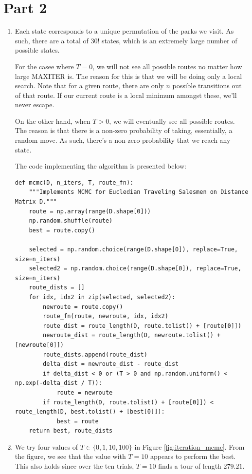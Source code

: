 \documentclass[12pt]{article}
\begin{document}
\newpage
\section*{Part 2}

\begin{enumerate}[label=(\alph*)]
  \item Each state corresponds to a unique permutation of the parks we visit. As such, there are a total of $30!$ states, which is an extremely large number of possible states.

  For the casee where $T = 0$, we will not see all possible routes no matter how large MAXITER is. The reason for this is that we will be doing only a local search. Note that for a given route, there are only $n$ possible transitions out of that route. If our current route is a local minimum amongst these, we'll never escape.

  On the other hand, when $T > 0$, we will eventually see all possible routes. The reason is that there is a non-zero probability of taking, essentially, a random move. As such, there's a non-zero probability that we reach any state.

  The code implementing the algorithm is presented below:
  \begin{verbatim}
def mcmc(D, n_iters, T, route_fn):
    """Implements MCMC for Eucledian Traveling Salesmen on Distance Matrix D."""
    route = np.array(range(D.shape[0]))
    np.random.shuffle(route)
    best = route.copy()
    
    selected = np.random.choice(range(D.shape[0]), replace=True, size=n_iters)
    selected2 = np.random.choice(range(D.shape[0]), replace=True, size=n_iters)
    route_dists = []
    for idx, idx2 in zip(selected, selected2):
        newroute = route.copy()
        route_fn(route, newroute, idx, idx2)
        route_dist = route_length(D, route.tolist() + [route[0]])
        newroute_dist = route_length(D, newroute.tolist() + [newroute[0]])
        route_dists.append(route_dist)
        delta_dist = newroute_dist - route_dist
        if delta_dist < 0 or (T > 0 and np.random.uniform() < np.exp(-delta_dist / T)):
            route = newroute
        if route_length(D, route.tolist() + [route[0]]) < route_length(D, best.tolist() + [best[0]]):
            best = route
    return best, route_dists
  \end{verbatim}

  \item
    We try four values of $T \in \{0, 1, 10, 100\}$ in Figure \ref{fig:iteration_mcmc}. From the figure, we see that the value with $T = 10$ appears to perform the best. This also holds since over the ten trials, $T=10$ finds a tour of length $279.21$.


\end{enumerate}
\end{document}

